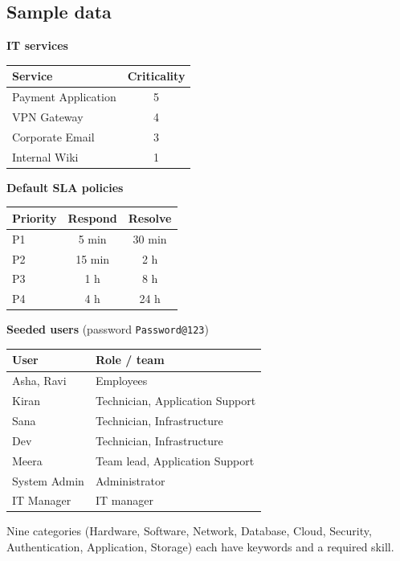 \documentclass[11pt,a4paper]{article}
\begin{document}
\subsection{Sample data}
\begin{minipage}[t]{0.48\linewidth}
\textbf{IT services}\par
\begin{tabular}{@{}lc@{}}
\toprule Service & Criticality \\ \midrule
Payment Application & 5 \\ VPN Gateway & 4 \\ Corporate Email & 3 \\ Internal Wiki & 1 \\ \bottomrule
\end{tabular}

\vspace{8pt}\textbf{Default SLA policies}\par
\begin{tabular}{@{}lcc@{}}
\toprule Priority & Respond & Resolve \\ \midrule
P1 & 5 min & 30 min \\ P2 & 15 min & 2 h \\ P3 & 1 h & 8 h \\ P4 & 4 h & 24 h \\ \bottomrule
\end{tabular}
\end{minipage}\hfill
\begin{minipage}[t]{0.5\linewidth}
\textbf{Seeded users} (password \texttt{Password@123})\par
\begin{tabular}{@{}ll@{}}
\toprule User & Role / team \\ \midrule
Asha, Ravi & Employees \\
Kiran & Technician, Application Support \\
Sana & Technician, Infrastructure \\
Dev & Technician, Infrastructure \\
Meera & Team lead, Application Support \\
System Admin & Administrator \\
IT Manager & IT manager \\ \bottomrule
\end{tabular}
\end{minipage}

\vspace{8pt}Nine categories (Hardware, Software, Network, Database, Cloud, Security, Authentication, Application, Storage) each have keywords and a required skill.
\end{document}
